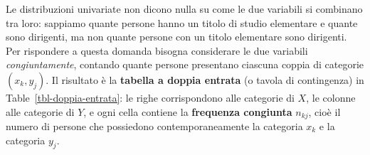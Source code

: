 \documentclass[
  a4paper,
  DIV=11,
  numbers=noendperiod]{scrreprt}
\begin{document}
\begin{table}

\caption{\label{tbl-freq-x}Distribuzioni di frequenza univariate.}


\end{table}%

Le distribuzioni univariate non dicono nulla su come le due variabili si
combinano tra loro: sappiamo quante persone hanno un titolo di studio
elementare e quante sono dirigenti, ma non quante persone con un titolo
elementare sono dirigenti. Per rispondere a questa domanda bisogna
considerare le due variabili \emph{congiuntamente}, contando quante
persone presentano ciascuna coppia di categorie \((x_k, y_j)\). Il
risultato è la \textbf{tabella a doppia entrata} (o tavola di
contingenza) in Table~\ref{tbl-doppia-entrata}: le righe corrispondono
alle categorie di \(X\), le colonne alle categorie di \(Y\), e ogni
cella contiene la \textbf{frequenza congiunta} \(n_{kj}\), cioè il
numero di persone che possiedono contemporaneamente la categoria \(x_k\)
e la categoria \(y_j\).
\end{document}
